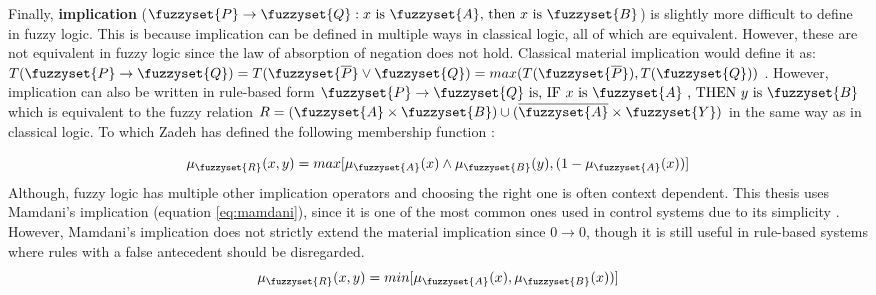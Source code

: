 Finally, \textbf{implication}  ($\fuzzyset{P}\to \fuzzyset{Q}: x \text{ is } \fuzzyset{A} \text{, then }x \text{ is } \fuzzyset{B}$) is slightly more difficult to define in fuzzy logic. This is because implication can be defined in multiple ways in classical logic, all of which are equivalent. However, these are not equivalent in fuzzy logic since the law of absorption of negation does not hold. Classical material implication would  define it as: $T(\fuzzyset{P}\to \fuzzyset{Q})=T(\fuzzyset{\overline{P}}\lor\fuzzyset{Q})=max(T(\fuzzyset{\overline{P}}),T(\fuzzyset{Q}))$ \cite{oh1987properties}.
However, implication can also be written in rule-based form  $\fuzzyset{P} \to \fuzzyset{Q} \text{ is,  IF } x \text{ is } \fuzzyset{A} \text{ , THEN } y \text{ is } \fuzzyset{B}$ which is equivalent to the fuzzy relation $R=(\fuzzyset{A}\times\fuzzyset{B})\cup (\overline{\fuzzyset{A}}\times \fuzzyset{Y})$ in the same way as in classical logic.
To which Zadeh has defined the following membership function \cite{oh1987properties}:

\begin{equation}
    \mu_{\fuzzyset{R}}(x,y)=max[\mu_{\fuzzyset{A}}(x)\land\mu_{\fuzzyset{B}}(y),(1-\mu_{\fuzzyset{A}}(x))]
    \label{eq:implication-orig}
\end{equation}
Although, fuzzy logic has multiple other implication operators and choosing the right one is often context dependent. This thesis uses Mamdani's implication (equation \ref{eq:mamdani}), since it is one of the most common ones used in control systems  due to its simplicity \cite{ross2009fuzzy}. However, Mamdani's implication does not strictly extend the material implication since $0 \to 0$, though it is still useful in rule-based systems where rules with a false antecedent should be disregarded.
\begin{equation}
    \mu_{\fuzzyset{R}}(x,y)=min[\mu_{\fuzzyset{A}}(x),\mu_{\fuzzyset{B}}(x))]
    \label{eq:mamdani}
\end{equation}


